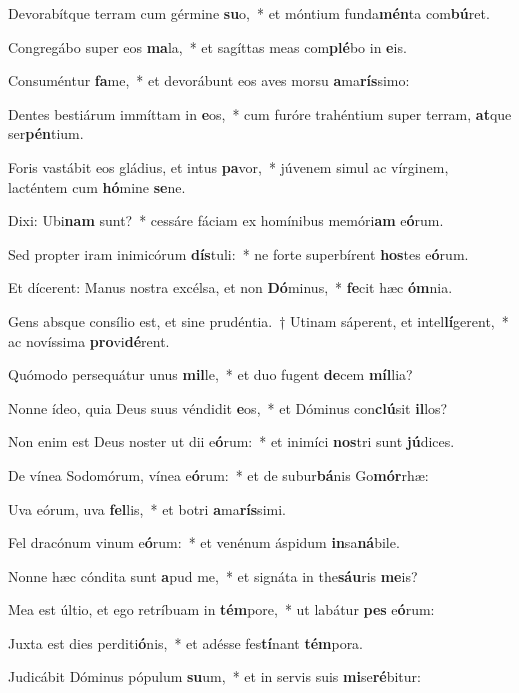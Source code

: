 \item Devorabítque terram cum gérmine \textbf{su}o,~* et móntium funda\textbf{mén}ta com\textbf{bú}ret.
\item Congregábo super eos \textbf{ma}la,~* et sagíttas meas com\textbf{plé}bo in \textbf{e}is.
\item Consuméntur \textbf{fa}me,~* et devorábunt eos aves morsu \textbf{a}ma\textbf{rís}simo:
\item Dentes bestiárum immíttam in \textbf{e}os,~* cum furóre trahéntium super terram, \textbf{at}que ser\textbf{pén}tium.
\item Foris vastábit eos gládius, et intus \textbf{pa}vor,~* júvenem simul ac vírginem, lacténtem cum \textbf{hó}mine \textbf{se}ne.
\item Dixi: Ubi\textbf{nam} sunt?~* cessáre fáciam ex homínibus memóri\textbf{am} e\textbf{ó}rum.
\item Sed propter iram inimicórum \textbf{dís}tuli:~* ne forte superbírent \textbf{hos}tes e\textbf{ó}rum.
\item Et dícerent: Manus nostra excélsa, et non \textbf{Dó}minus,~* \textbf{fe}cit hæc \textbf{óm}nia.
\item Gens absque consílio est, et sine prudéntia.~† Utinam sáperent, et intel\textbf{lí}gerent,~* ac novíssima \textbf{pro}vi\textbf{dé}rent.
\item Quómodo persequátur unus \textbf{mil}le,~* et duo fugent \textbf{de}cem \textbf{míl}lia?
\item Nonne ídeo, quia Deus suus véndidit \textbf{e}os,~* et Dóminus con\textbf{clú}sit \textbf{il}los?
\item Non enim est Deus noster ut dii e\textbf{ó}rum:~* et inimíci \textbf{nos}tri sunt \textbf{jú}dices.
\item De vínea Sodomórum, vínea e\textbf{ó}rum:~* et de subur\textbf{bá}nis Go\textbf{mór}rhæ:
\item Uva eórum, uva \textbf{fel}lis,~* et botri \textbf{a}ma\textbf{rís}simi.
\item Fel dracónum vinum e\textbf{ó}rum:~* et venénum áspidum \textbf{in}sa\textbf{ná}bile.
\item Nonne hæc cóndita sunt \textbf{a}pud me,~* et signáta in the\textbf{sáu}ris \textbf{me}is?
\item Mea est últio, et ego retríbuam in \textbf{tém}pore,~* ut labátur \textbf{pes} e\textbf{ó}rum:
\item Juxta est dies perditi\textbf{ó}nis,~* et adésse fes\textbf{tí}nant \textbf{tém}pora.
\item Judicábit Dóminus pópulum \textbf{su}um,~* et in servis suis \textbf{mi}se\textbf{ré}bitur:
